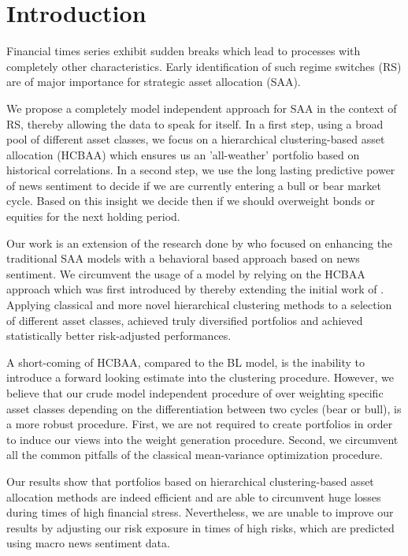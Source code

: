 \section{Introduction}

Financial times series exhibit sudden breaks which lead to processes with completely other characteristics. Early identification of such regime switches (RS) are of major importance for strategic asset allocation (SAA). 

We propose a completely model independent approach for SAA in the context of RS, thereby allowing the data to speak for itself. In a first step, using a broad pool of different asset classes, we focus on a  hierarchical clustering-based asset allocation (HCBAA) which ensures us an 'all-weather' portfolio based on historical correlations. In a second step, we use the long lasting predictive power of news sentiment to decide if we are currently entering a bull or bear market cycle. Based on this insight we decide then if we should overweight bonds or equities for the next holding period. 

Our work is an extension of the research done by \citet{enhPortOpti} who focused on enhancing the traditional \citet{black1992global} SAA models with a behavioral based approach based on news sentiment. We circumvent the usage of a model by relying on the HCBAA approach which was first introduced by \citet{raffinot2017hierarchical} thereby extending the initial work of \citet{de2016building}. Applying classical and more novel hierarchical clustering methods to a selection of different asset classes, \citet{raffinot2017hierarchical} achieved truly diversified portfolios and achieved statistically better risk-adjusted performances. 

A short-coming of HCBAA, compared to the BL model, is the inability to introduce a forward looking estimate into the clustering procedure. However, we believe that our crude model independent procedure of over weighting specific asset classes depending on the differentiation between two cycles (bear or bull), is a more robust procedure. First, we are not required to create portfolios in order to induce our views into the weight generation procedure. Second, we circumvent all the common pitfalls of the classical mean-variance optimization procedure. 

Our results show that portfolios based on hierarchical clustering-based asset allocation methods are indeed efficient and are able to circumvent huge losses during times of high financial stress. Nevertheless, we are unable to improve our results by adjusting our risk exposure in times of high risks, which are predicted using macro news sentiment data.


